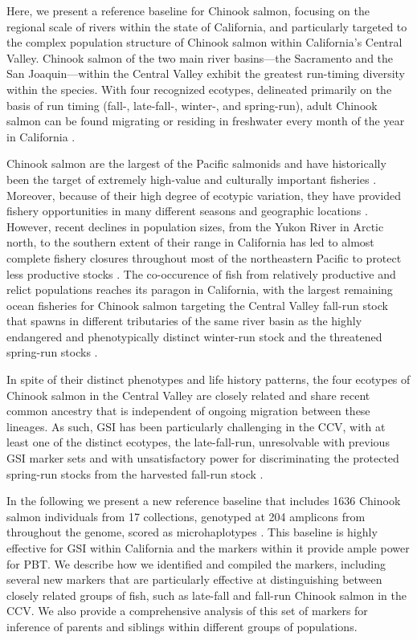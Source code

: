 Here, we present a reference baseline for Chinook salmon, focusing on the regional scale of
rivers within the state of California, and particularly targeted to the complex population
structure of Chinook salmon within California's Central Valley. Chinook salmon of the two main river basins---the
Sacramento and the San Joaquin---within the Central Valley exhibit the greatest run-timing diversity
within the species.  With four recognized ecotypes, delineated primarily on the basis of run timing
(fall-, late-fall-, winter-, and spring-run), adult Chinook salmon can be found migrating or residing
in freshwater every month of the year in California \citep{fisher1994past}.

Chinook salmon are the largest of the Pacific salmonids and have historically been the target of extremely high-value and culturally important
fisheries \citep{myers1998status}. Moreover, because of their high degree of ecotypic variation, they have provided fishery opportunities in many
different seasons and geographic locations \citep{healey1991life}. However, recent declines in population sizes, from the Yukon River in Arctic north,
to the southern extent of their range in California has led to almost complete fishery closures  throughout most of the northeastern Pacific to protect
less productive stocks . The co-occurence of fish from relatively productive and relict populations reaches its paragon in California,
with the largest remaining ocean fisheries for Chinook salmon targeting the Central Valley fall-run stock that spawns in different tributaries of the
same river basin as the highly endangered and phenotypically distinct winter-run stock and the threatened spring-run stocks .

In spite of their distinct phenotypes and life history patterns, the four ecotypes of Chinook salmon in the Central Valley are closely related
\citep{clemento2014evaluation} and share recent common ancestry that is independent of ongoing migration between these lineages. As such, GSI
has been particularly challenging in the CCV, with at least one of the distinct ecotypes, the late-fall-run, unresolvable with previous GSI marker sets
\citep{seeb2007development,clemento2014evaluation} and with unsatisfactory power for discriminating the protected spring-run stocks from the
harvested fall-run stock .

In the following we present a new reference baseline that includes 1636 Chinook salmon individuals
from 17 collections, genotyped at 204 amplicons from throughout the genome,
scored as microhaplotypes \citep{baetscher2018microhaplotypes}. This baseline is
highly effective for GSI within California and the markers within it provide ample power
for PBT.
We describe how we identified and compiled the markers, including several new markers
that are particularly effective at distinguishing between closely related groups of fish,
such as late-fall and fall-run Chinook salmon in the CCV.  We also provide a comprehensive analysis of this
set of markers for inference of parents and siblings within different groups of populations.



